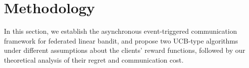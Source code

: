 \section{Methodology}
In this section, we establish the asynchronous event-triggered communication framework for federated linear bandit, and propose two UCB-type algorithms under different assumptions about the clients' reward functions, followed by our theoretical analysis of their regret and communication cost.

